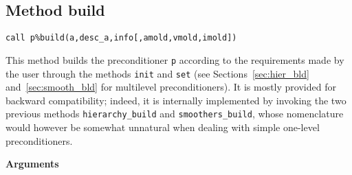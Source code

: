 \clearpage

\subsection{Method build\label{sec:precbld}}
  
\begin{center}
\verb|call p%build(a,desc_a,info[,amold,vmold,imold])|\\
\end{center}

\noindent
This method builds the preconditioner \verb|p| according to the requirements
made by the user through the methods \verb|init| and \verb|set|
(see Sections~\ref{sec:hier_bld} and~\ref{sec:smooth_bld} for
multilevel preconditioners). It is mostly provided for backward
compatibility; indeed, it is internally implemented by invoking the
two previous methods \verb|hierarchy_build| and
\verb|smoothers_build|, whose nomenclature would however  be somewhat  
unnatural when dealing with simple one-level preconditioners. 

{\baselineskip\noindent\large\bfseries Arguments} \smallskip

